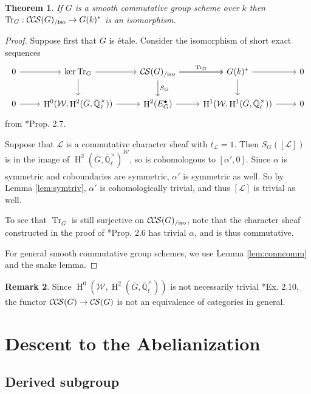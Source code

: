 \documentclass[10pt]{amsart}
\theoremstyle{plain}
\newtheorem{theorem}{Theorem}[section]
\theoremstyle{definition}
\newtheorem{remark}[theorem]{Remark}
\newcommand{\EE}{\mathbb{\bar Q}_\ell}
\newcommand{\Fq}{k}
\newcommand{\EEx}{\EE^\times}
\newcommand{\Weil}[1]{\mathcal{W}_{#1}}
\DeclareMathOperator{\Hh}{H}
\newcommand{\trFrob}[1]{t_{#1}}
\newcommand{\TrFrob}[1]{\operatorname{Tr}_{#1}}
\newcommand{\cs}[1]{{\mathcal{#1}}}
\newcommand{\CS}{{\mathcal{C\hskip-0.8pt S}}}
\newcommand{\CCS}{{\mathcal{C\hskip-.8pt C\hskip-0.8pt S}}}
\newcommand{\CSiso}[1]{\CS(#1)_{/\text{iso}}}
\newcommand{\CCSiso}[1]{\CCS(#1)_{/\text{iso}}}
\newcommand{\bG}{\bar{G}}
\begin{document}
\begin{theorem} \label{thm:trfrobiso}
If $G$ is a smooth commutative group scheme over $\Fq$ then $\TrFrob{G} : \CCSiso{G} \to G(\Fq)^*$ is an isomorphism.
\end{theorem}

\begin{proof}
Suppose first that $G$ is \'etale.  Consider the isomorphism of short exact sequences
\[
\begin{tikzcd}
 0 \arrow{r} & \ker \TrFrob{G} \arrow{d} \arrow{r} & \CSiso{G}\arrow{d}{S_G} \arrow{r}{\TrFrob{G}} \arrow{r} & G(\Fq)^* \arrow{d} \arrow{r} & 0\\
  0 \arrow{r} & \Hh^0(\Weil{},\Hh^2(\bG,\EEx)) \arrow{r} & \Hh^2(E^\bullet_G) \arrow{r} & \Hh^1(\Weil{},\Hh^1(\bG,\EEx)) \arrow{r} & 0
 \end{tikzcd}
 \]
from \cite{cunningham-roe:13a}*{Prop. 2.7}.

Suppose that $\cs{L}$ is a commutative character sheaf
with $\trFrob{\cs{L}} = 1$.  Then $S_G([\cs{L}])$ is in the image of $\Hh^2(\bG, \EEx)^\Weil{}$, so is cohomologous to
$[\alpha', 0]$.  Since $\alpha$ is symmetric and coboundaries are symmetric, $\alpha'$ is symmetric as well.
So by Lemma \ref{lem:symtriv}, $\alpha'$ is cohomologically trivial, and thus $[\cs{L}]$ is trivial as well.

To see that $\TrFrob{G}$ is still surjective on $\CCSiso{G}$, note that the character sheaf constructed in the proof of
\cite{cunningham-roe:13a}*{Prop. 2.6} has trivial $\alpha$, and is thus commutative.

For general smooth commutative group schemes, we use Lemma \ref{lem:conncomm} and the snake lemma.
\end{proof}

\begin{remark}
Since $\Hh^0(\Weil{},\Hh^2(\bG,\EEx))$ is not necessarily trivial \cite{cunningham-roe:13a}*{Ex. 2.10}, the functor
$\CCS(G) \to \CS(G)$ is not an equivalence of categories in general.
\end{remark}


\section{Descent to the Abelianization}

\subsection{Derived subgroup}
\end{document}
